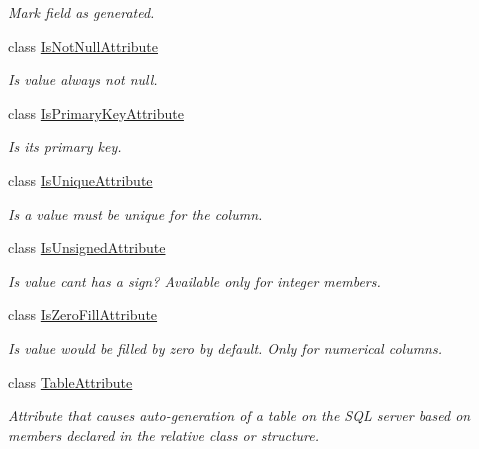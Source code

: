 \begin{DoxyCompactItemize}
\begin{DoxyCompactList}\small\item\em Mark field as generated. \end{DoxyCompactList}\item 
class \mbox{\hyperlink{class_uniform_data_operator_1_1_sql_1_1_markup_1_1_is_not_null_attribute}{Is\+Not\+Null\+Attribute}}
\begin{DoxyCompactList}\small\item\em Is value always not null. \end{DoxyCompactList}\item 
class \mbox{\hyperlink{class_uniform_data_operator_1_1_sql_1_1_markup_1_1_is_primary_key_attribute}{Is\+Primary\+Key\+Attribute}}
\begin{DoxyCompactList}\small\item\em Is it\textquotesingle{}s primary key. \end{DoxyCompactList}\item 
class \mbox{\hyperlink{class_uniform_data_operator_1_1_sql_1_1_markup_1_1_is_unique_attribute}{Is\+Unique\+Attribute}}
\begin{DoxyCompactList}\small\item\em Is a value must be unique for the column. \end{DoxyCompactList}\item 
class \mbox{\hyperlink{class_uniform_data_operator_1_1_sql_1_1_markup_1_1_is_unsigned_attribute}{Is\+Unsigned\+Attribute}}
\begin{DoxyCompactList}\small\item\em Is value can\textquotesingle{}t has a sign? Available only for integer members. \end{DoxyCompactList}\item 
class \mbox{\hyperlink{class_uniform_data_operator_1_1_sql_1_1_markup_1_1_is_zero_fill_attribute}{Is\+Zero\+Fill\+Attribute}}
\begin{DoxyCompactList}\small\item\em Is value would be filled by zero by default. Only for numerical columns. \end{DoxyCompactList}\item 
class \mbox{\hyperlink{class_uniform_data_operator_1_1_sql_1_1_markup_1_1_table_attribute}{Table\+Attribute}}
\begin{DoxyCompactList}\small\item\em Attribute that causes auto-\/generation of a table on the S\+QL server based on members declared in the relative class or structure. \end{DoxyCompactList}\end{DoxyCompactItemize}

